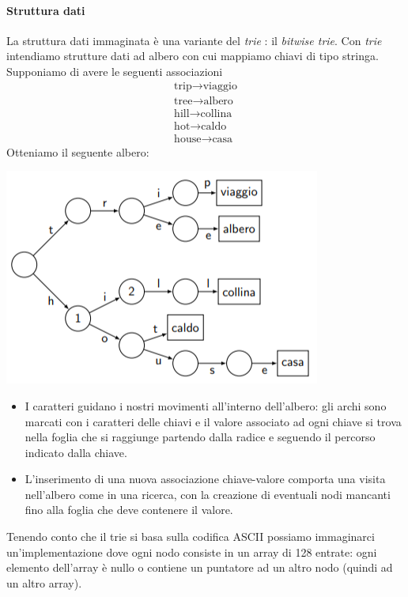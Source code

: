 \documentclass[11pt]{report}
\theoremstyle{definition}
\begin{document}
\paragraph{Struttura dati} La struttura dati immaginata è una variante del \emph{trie}
: il \emph{bitwise trie}. Con \emph{trie} intendiamo strutture dati ad albero con cui mappiamo chiavi di tipo stringa. Supponiamo di avere le seguenti associazioni
\[\begin{array}{l}\text{trip} \longrightarrow \text{viaggio}\\\text{tree} \longrightarrow \text{albero}\\\text{hill} \longrightarrow \text{collina}\\\text{hot} \longrightarrow \text{caldo}\\\text{house} \longrightarrow \text{casa} \end{array}\]
Otteniamo il seguente albero:
\begin{center}
	\includegraphics{img/215.PNG}
\end{center}
\begin{itemize}
	\item I caratteri guidano i nostri movimenti all'interno dell'albero: gli archi sono marcati con i caratteri delle chiavi e il valore associato ad ogni chiave si trova nella foglia che si raggiunge partendo dalla radice e seguendo il percorso indicato dalla chiave. 
	\item L'inserimento di una nuova associazione chiave-valore comporta una visita nell'albero come in una ricerca, con la creazione di eventuali nodi mancanti fino alla foglia che deve contenere il valore.
\end{itemize}
Tenendo conto che il trie si basa sulla codifica ASCII possiamo immaginarci un'implementazione dove ogni nodo consiste in un array di 128 entrate: ogni elemento dell'array è nullo o contiene un puntatore ad un altro nodo (quindi ad un altro array).
\end{document}
